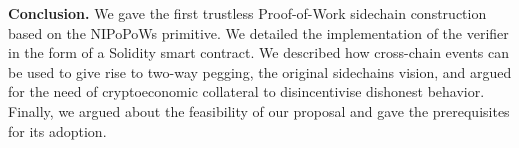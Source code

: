 
\noindent
\textbf{Conclusion.}
We gave the first trustless Proof-of-Work sidechain construction based on
the NIPoPoWs primitive. We detailed the implementation of the verifier in the
form of a Solidity smart contract. We described how cross-chain events can
be used to give rise to two-way pegging, the original sidechains vision, and
argued for the need of cryptoeconomic collateral to disincentivise dishonest
behavior. Finally, we argued about the feasibility of our proposal and gave the
prerequisites for its adoption.
